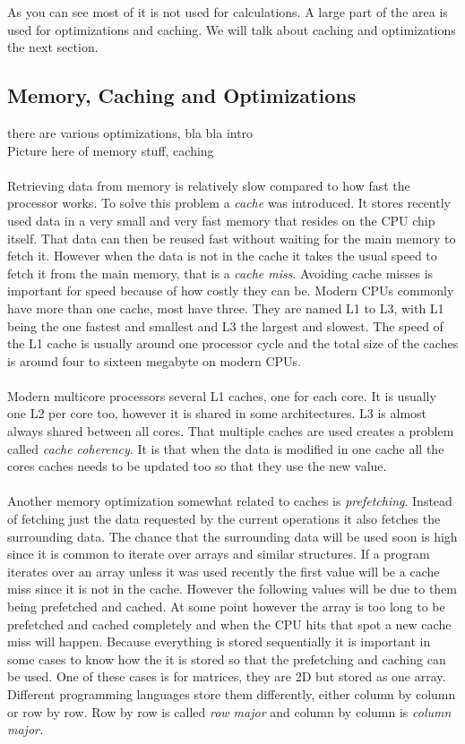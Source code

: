 \documentclass[10pt,a4paper]{report}
\begin{document}

As you can see most of it is not used for calculations. A large part of the area is used for optimizations and caching. We will talk about caching and optimizations the next section. 

\subsection{Memory, Caching and Optimizations}
there are various optimizations, bla bla intro
\\
Picture here of memory stuff, caching\\
\\
Retrieving data from memory is relatively slow compared to how fast the processor works\cite{introduction_hpc_hager,drepper2007cpumemory}. %
To solve this problem a \emph{cache} was introduced. It stores recently used data in a very small and very fast memory that resides on the CPU chip itself. That data can then be reused fast without waiting for the main memory to fetch it. However when the data is not in the cache it takes the usual speed to fetch it from the main memory, that is a \emph{cache miss}. Avoiding cache misses is important for speed because of how costly they can be. Modern CPUs commonly have more than one cache, most have three. They are named L1 to L3, with L1 being the one fastest and smallest and L3 the largest and slowest. The speed of the L1 cache is usually around one processor cycle and the total size of the caches is around four to sixteen megabyte on modern CPUs.\\
\\
Modern multicore processors several L1 caches, one for each core. It is usually one L2 per core too, however it is shared in some architectures. L3 is almost always shared between all cores. That multiple caches are used creates a problem called \emph{cache coherency}. It is that when the data is modified in one cache all the cores caches needs to be updated too so that they use the new value.\\
\\
Another memory optimization somewhat related to caches is \emph{prefetching}\cite{introduction_hpc_hager}. Instead of fetching just the data requested by the current operations it also fetches the surrounding data. The chance that the surrounding data will be used soon is high since it is common to iterate over arrays and similar structures\cite{introduction_hpc_hager}. If a program iterates over an array unless it was used recently the first value will be a cache miss since it is not in the cache. However the following values will be due to them being prefetched and cached. At some point however the array is too long to be prefetched and cached completely and when the CPU hits that spot a new cache miss will happen. Because everything is stored sequentially it is important in some cases to know how the it is stored so that the prefetching and caching can be used. One of these cases is for matrices, they are 2D but stored as one array. Different programming languages store them differently, either column by column or row by row. Row by row is called \emph{row major} and column by column is \emph{column major.}\\
\end{document}
